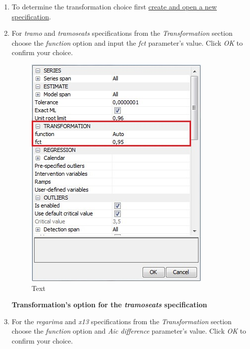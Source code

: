 \documentclass[
  letterpaper,
  DIV=11,
  numbers=noendperiod]{scrreprt}
\begin{document}
\begin{enumerate}
\def\labelenumi{\arabic{enumi}.}
\item
  To determine the transformation choice first
  \protect\hyperlink{pre-defined-specifications}{create and open a new
  specification}.
\item
  For \emph{tramo} and \emph{tramoseats} specifications from the
  \emph{Transformation} section choose the \emph{function} option and
  input the \emph{fct} parameter's value. Click \emph{OK} to confirm
  your choice.

  \begin{figure}

  {\centering \includegraphics{./All_images/UG_SA_image39.jpg}

  }

  \caption{Text}

  \end{figure}

  \textbf{Transformation's option for the \emph{tramoseats}
  specification}
\item
  For the \emph{regarima} and \emph{x13} specifications from the
  \emph{Transformation} section choose the \emph{function} option and
  \emph{Aic difference} parameter's value. Click \emph{OK} to confirm
  your choice.

  \begin{figure}


\end{figure}
\end{enumerate}
\end{document}
